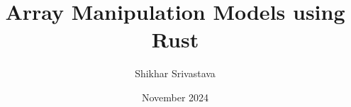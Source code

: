 \documentclass{article}
\title{Array Manipulation Models using Rust}
\author{Shikhar Srivastava}
\date{November 2024}
\begin{document}
\maketitle
\pagebreak

\pagebreak
\nocite{*}
\printbibliography
\end{document}
